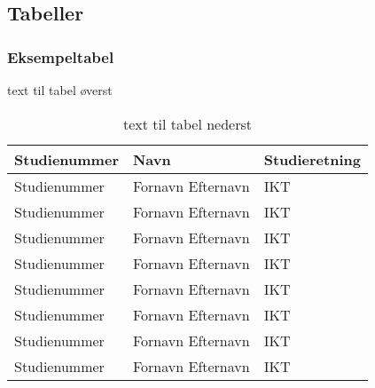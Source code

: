 \subsection{Tabeller}

\subsubsection{Eksempeltabel}

\begin{table}[H] %
    \caption{text til tabel øverst}
    \centering
\begin{tabular}{|l|l|l|}
    \hline
    \rowcolor{blue!25}
    \textbf{Studienummer} & \textbf{Navn} & \textbf{Studieretning} \\ [2pt]
    \hline
    Studienummer & Fornavn Efternavn & IKT \\
    \hline
    Studienummer & Fornavn Efternavn & IKT \\
    \hline
    Studienummer & Fornavn Efternavn & IKT \\
    \hline
    Studienummer & Fornavn Efternavn & IKT \\
    \hline
    Studienummer & Fornavn Efternavn & IKT \\
    \hline
    Studienummer & Fornavn Efternavn & IKT \\
    \hline
    Studienummer & Fornavn Efternavn & IKT \\
    \hline
    Studienummer & Fornavn Efternavn & IKT \\
    \hline
\end{tabular}
\caption{text til tabel nederst}
\end{table}
